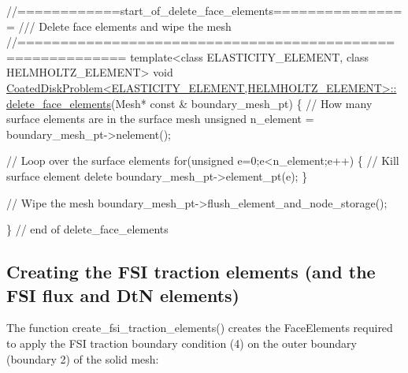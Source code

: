  
\begin{DoxyCodeInclude}
\textcolor{comment}{//============start\_of\_delete\_face\_elements================}
\textcolor{comment}{/// Delete face elements and wipe the mesh}
\textcolor{comment}{}\textcolor{comment}{//==========================================================}
\textcolor{keyword}{template}<\textcolor{keyword}{class} ELASTICITY\_ELEMENT, \textcolor{keyword}{class} HELMHOLTZ\_ELEMENT>
\textcolor{keywordtype}{void} \hyperlink{classCoatedDiskProblem_a55b4cead41e01ab5fd728b607f62bb74}{CoatedDiskProblem<ELASTICITY\_ELEMENT,HELMHOLTZ\_ELEMENT>::}
\hyperlink{classCoatedDiskProblem_a55b4cead41e01ab5fd728b607f62bb74}{delete\_face\_elements}(Mesh* \textcolor{keyword}{const} & boundary\_mesh\_pt)
\{
 \textcolor{comment}{// How many surface elements are in the surface mesh}
 \textcolor{keywordtype}{unsigned} n\_element = boundary\_mesh\_pt->nelement();

 \textcolor{comment}{// Loop over the surface elements}
 \textcolor{keywordflow}{for}(\textcolor{keywordtype}{unsigned} e=0;e<n\_element;e++)
  \{
   \textcolor{comment}{//   Kill surface element}
   \textcolor{keyword}{delete} boundary\_mesh\_pt->element\_pt(e);
  \}
 
 \textcolor{comment}{// Wipe the mesh}
 boundary\_mesh\_pt->flush\_element\_and\_node\_storage();
 
\} \textcolor{comment}{// end of delete\_face\_elements}

\end{DoxyCodeInclude}




 

\hypertarget{index_create_flux}{}\subsection{Creating the F\+S\+I traction elements (and the F\+S\+I flux and Dt\+N elements)}\label{index_create_flux}
The function {\ttfamily create\+\_\+fsi\+\_\+traction\+\_\+elements()} creates the {\ttfamily Face\+Elements} required to apply the F\+SI traction boundary condition (4) on the outer boundary (boundary 2) of the solid mesh\+:


